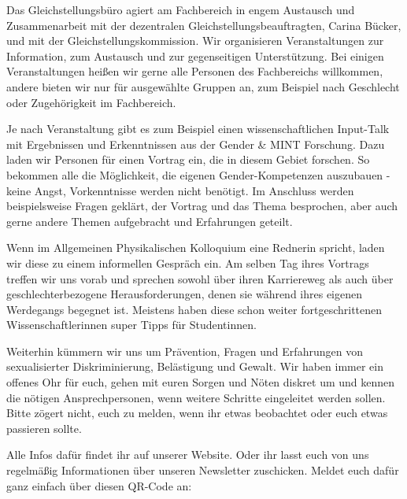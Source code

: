 \begin{multicols}{2}
Das Gleichstellungsbüro agiert am Fachbereich in engem Austausch und Zusammenarbeit mit der dezentralen Gleichstellungsbeauftragten, Carina Bücker, und mit der Gleichstellungskommission. Wir organisieren Veranstaltungen zur Information, zum Austausch und zur gegenseitigen Unterstützung. Bei einigen Veranstaltungen heißen wir gerne alle Personen des Fachbereichs willkommen, andere bieten wir nur für ausgewählte Gruppen an, zum Beispiel nach Geschlecht oder Zugehörigkeit im Fachbereich.

Je nach Veranstaltung gibt es zum Beispiel einen wissenschaftlichen Input-Talk mit Ergebnissen und Erkenntnissen aus der Gender & MINT Forschung. Dazu laden wir Personen für einen Vortrag ein, die in diesem Gebiet forschen. So bekommen alle die Möglichkeit, die eigenen Gender-Kompetenzen auszubauen - keine Angst, Vorkenntnisse werden nicht benötigt. Im Anschluss werden beispielsweise Fragen geklärt, der Vortrag und das Thema besprochen, aber auch gerne andere Themen aufgebracht und Erfahrungen geteilt.

Wenn im Allgemeinen Physikalischen Kolloquium eine Rednerin spricht, laden wir diese zu einem informellen Gespräch ein. Am selben Tag ihres Vortrags treffen wir uns vorab und sprechen sowohl über ihren Karriereweg als auch über geschlechterbezogene Herausforderungen, denen sie während ihres eigenen Werdegangs begegnet ist. Meistens haben diese schon weiter fortgeschrittenen Wissenschaftlerinnen super Tipps für Studentinnen.

Weiterhin kümmern wir uns um Prävention, Fragen und Erfahrungen von sexualisierter Diskriminierung, Belästigung und Gewalt. Wir haben immer ein offenes Ohr für euch, gehen mit euren Sorgen und Nöten diskret um und kennen die nötigen Ansprechpersonen, wenn weitere Schritte eingeleitet werden sollen. Bitte zögert nicht, euch zu melden, wenn ihr etwas beobachtet oder euch etwas passieren sollte.

\begin{multicols}{2}
Alle Infos dafür findet ihr auf unserer \mbox{Website\footnotemark}. Oder ihr lasst euch von uns regelmäßig Informationen über unseren Newsletter zuschicken. Meldet euch dafür ganz einfach über diesen QR-Code an:
\end{multicols}


\end{multicols}
